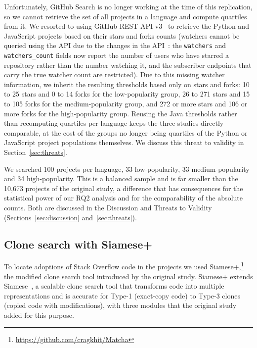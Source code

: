 \documentclass[onecolumn,11pt]{IEEEtran}
\begin{document}
Unfortunately, GitHub Search is no longer working at the time of this replication, so we cannot retrieve the set of all projects in a language and compute quartiles from it. We resorted to using GitHub REST API v3~\cite{githubapi} to retrieve the Python and JavaScript projects based on their stars and forks counts (watchers cannot be queried using the API due to the changes in the API~\cite{githubwatching}: the \texttt{watchers} and \texttt{watchers\_count} fields now report the number of users who have starred a repository rather than the number watching it, and the subscriber endpoints that carry the true watcher count are restricted).
Due to this missing watcher information, we inherit the resulting thresholds based only on stars and forks: 10 to 25 stars and 0 to 14 forks for the low-popularity group, 26 to 271 stars and 15 to 105 forks for the medium-popularity group, and 272 or more stars and 106 or more forks for the high-popularity group.
Reusing the Java thresholds rather than recomputing quartiles per language keeps the three studies directly comparable, at the cost of the groups no longer being quartiles of the Python or JavaScript project populations themselves.
We discuss this threat to validity in Section~\ref{sec:threats}.

We searched 100 projects per language, 33 low-popularity, 33 medium-popularity and 34 high-popularity.
This is a balanced sample and is far smaller than the 10{,}673 projects of the original study, a difference that has consequences for the statistical power of our RQ2 analysis and for the comparability of the absolute counts.
Both are discussed in the Discussion and Threats to Validity (Sections~\ref{sec:discussion} and~\ref{sec:threats}). 

\subsection{Clone search with Siamese+}

To locate adoptions of Stack Overflow code in the projects we used Siamese+,\footnote{\url{https://github.com/cragkhit/Matcha}} the modified clone search tool introduced by the original study.
Siamese+ extends Siamese~\cite{ragkhitwetsagul2019siamese}, a scalable clone search tool that transforms code into multiple representations and is accurate for Type-1 (exact-copy code) to Type-3 clones (copied code with modifications), with three modules that the original study added for this purpose.
\end{document}
